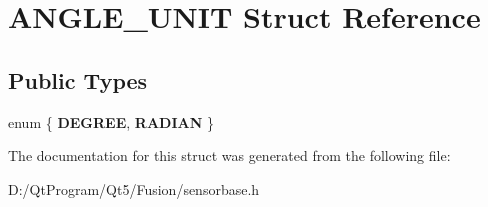 \hypertarget{struct_a_n_g_l_e___u_n_i_t}{}\section{A\+N\+G\+L\+E\+\_\+\+U\+N\+I\+T Struct Reference}
\label{struct_a_n_g_l_e___u_n_i_t}
\subsection*{Public Types}
\begin{DoxyCompactItemize}
\item 
\hypertarget{struct_a_n_g_l_e___u_n_i_t_a913c504dfc0909d588765d0d97603848}{}enum \{ {\bfseries D\+E\+G\+R\+E\+E}, 
{\bfseries R\+A\+D\+I\+A\+N}
 \}\label{struct_a_n_g_l_e___u_n_i_t_a913c504dfc0909d588765d0d97603848}

\end{DoxyCompactItemize}


The documentation for this struct was generated from the following file\+:\begin{DoxyCompactItemize}
\item 
D\+:/\+Qt\+Program/\+Qt5/\+Fusion/sensorbase.\+h\end{DoxyCompactItemize}
